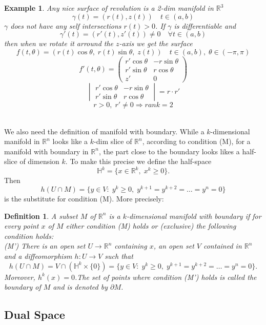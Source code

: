 \documentclass[12pt]{article}
\def\RR{\mathbb{R}}
\newtheorem{definition}{Definition}[section]
\newtheorem{example}{Example}[section]
\begin{document}
\begin{example}
Any nice surface of revolution is a 2-dim manifold in $\RR^3$ 
\[\gamma(t) = (r(t), z(t)) \quad t \in (a,b)\]
$\gamma$ does not have any self intersections $r(t)>0$. If $\gamma$ is differentiable and
\[\gamma'(t) = (r'(t) , z'(t)) \neq 0 \quad \forall t \in (a,b)\]
then when we rotate it arround the $z$-axis we get the surface
\[f(t,\theta) = (r(t)\cos\theta, \; r(t)\sin\theta, \; z(t)) \quad t \in (a,b), \; \theta \in (-\pi , \pi)\]
\[f'(t,\theta) = \begin{pmatrix} r'\cos\theta & -r\sin\theta \\ r'\sin\theta & r\cos\theta \\ z' & 0 \end{pmatrix}\]
\[\begin{vmatrix} r'\cos\theta & -r\sin\theta \\ r'\sin\theta & r\cos\theta \end{vmatrix} = r\cdot r'\]
\[r>0, \; r' \neq 0 \Rightarrow rank =2 \]
\end{example} 

\quad \\
We also need the definition of manifold with boundary. While a $k$-dimensional manifold in $\RR^n$ looks like a $k$-dim  slice of $\RR^n$, according to condition (M), for a manifold with boundary in $\RR^n$, the part close to the boundary looks likes a half-slice of dimension $k$. To make this precise we define the half-space
\[\mathbb{H}^k = \{x \in \RR^k, \;  x^k \geq 0 \}.\]
Then
\[h(U \cap M) = \{ y \in V: \; y^k \geq 0, \;y^{k+1} = y^{k+2} = \dots = y^{n} = 0\}\]
is the substitute for condition (M). More precisely:

\begin{definition} 
A subset $M$ of $\RR^n$ is a $k$-dimensional manifold with boundary if for every point $x$ of $M$ either condition (M) holds or (exclusive) the following condition holds: \\
(M') There is an open set $U \rightarrow \RR^n$ containing $x$, an open set $V$ contained in $\RR^n$ and a
diffeomorphism $h : U \rightarrow V$ such that
\[h(U \cap M) = V \cap (\mathbb{H}^k\times \{0\}) = \{ y \in V: \; y^k \geq 0, \;y^{k+1} = y^{k+2} = \dots = y^{n} = 0\}.\]
Moreover, $h^k(x) = 0$.The set of points where condition (M') holds is called the boundary of $M$ and is denoted
by $\partial M$.
\end{definition}

\subsection{Dual Space}
\end{document}
